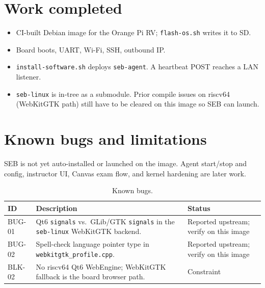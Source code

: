 \documentclass[11pt]{article}
\newcommand{\todo}{\textit{TODO}}
\begin{document}
\section{Work completed}

\begin{itemize}\setlength{\itemsep}{0.12em}
  \item CI-built Debian image for the Orange Pi RV; \texttt{flash-os.sh} writes it to SD.
  \item Board boots, UART, Wi-Fi, SSH, outbound IP.
  \item \texttt{install-software.sh} deploys \texttt{seb-agent}. A heartbeat POST reaches a LAN listener.
  \item \texttt{seb-linux} is in-tree as a submodule. Prior compile issues on riscv64 (WebKitGTK path) still have to be cleared on this image so SEB can launch.
\end{itemize}


\section{Known bugs and limitations}

SEB is not yet auto-installed or launched on the image. Agent start/stop and config, instructor UI, Canvas exam flow, and kernel hardening are later work.

\begin{table}[H]
  \centering
  \footnotesize
  \begin{tabularx}{\textwidth}{@{}p{}X p{}@{}}
    \toprule
    \textbf{ID} & \textbf{Description} & \textbf{Status} \\
    \midrule
    BUG-01 &
    Qt6 \texttt{signals} vs.\ GLib/GTK \texttt{signals} in the \texttt{seb-linux} WebKitGTK backend. &
    Reported upstream; verify on this image \\
    BUG-02 &
    Spell-check language pointer type in \texttt{webkitgtk\_profile.cpp}. &
    Reported upstream; verify on this image \\
    BLK-02 &
    No riscv64 Qt6 WebEngine; WebKitGTK fallback is the board browser path. &
    Constraint \\
    \bottomrule
  \end{tabularx}
  \caption{Known bugs.}
  \label{tab:bugs}
\end{table}
\end{document}
